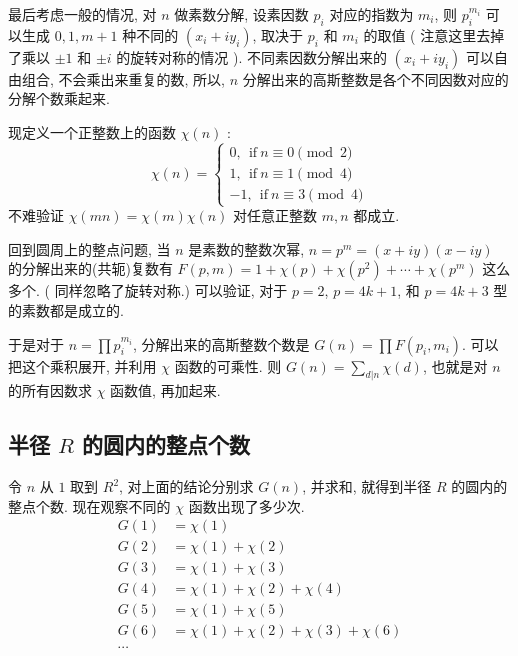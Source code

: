 最后考虑一般的情况, 对 $ n $ 做素数分解, 设素因数 $ p_i $ 对应的指数为 $ m_i $, 则 $ p_i^{m_i} $ 可以生成 $ 0, 1, m+1 $ 种不同的 $(x_i+iy_i)$, 取决于 $ p_i $ 和 $ m_i $ 的取值 ( 注意这里去掉了乘以 $ \pm 1 $ 和 $ \pm i $ 的旋转对称的情况 ). 不同素因数分解出来的 $(x_i+iy_i)$ 可以自由组合, 不会乘出来重复的数, 所以, $ n $ 分解出来的高斯整数是各个不同因数对应的分解个数乘起来.


现定义一个正整数上的函数 $ \chi(n) $ : 
\begin{equation*}
\chi(n) = \begin{cases}
0,\ \ \textrm{if} \ n \equiv 0 \pmod{2}\\
1,\ \ \textrm{if} \ n \equiv 1 \pmod{4}\\
-1,\ \ \textrm{if} \ n \equiv 3 \pmod{4}
\end{cases}
\end{equation*}
不难验证 $ \chi(mn) = \chi(m)\chi(n) $ 对任意正整数 $ m, n $ 都成立.

回到圆周上的整点问题, 当 $ n $ 是素数的整数次幂, $ n=p^m=(x+iy)(x-iy) $ 的分解出来的(共轭)复数有 $ F(p,m) = 1 + \chi(p) + \chi(p^2) + \cdots + \chi(p^m) $ 这么多个. ( 同样忽略了旋转对称.) 可以验证, 对于 $ p = 2 $, $ p = 4k+1 $, 和 $ p=4k+3 $ 型的素数都是成立的. 

于是对于 $ n = \prod{p_i^{m_i}} $, 分解出来的高斯整数个数是 $ G(n) = \prod{F(p_i,m_i)} $. 可以把这个乘积展开, 并利用 $ \chi $ 函数的可乘性. 则 $ G(n) = \sum_{d|n}{\chi(d)} $, 也就是对 $ n $ 的所有因数求 $ \chi $ 函数值, 再加起来. 

\subsection{半径 \texorpdfstring{$ R $}{R} 的圆内的整点个数}
令 $ n $ 从 $ 1 $ 取到 $ R^2 $, 对上面的结论分别求 $ G(n) $, 并求和, 就得到半径 $ R $ 的圆内的整点个数. 现在观察不同的 $ \chi $ 函数出现了多少次.
\begin{align*}
G(1) &= \chi(1) \\
G(2) &= \chi(1) + \chi(2) \\
G(3) &= \chi(1) + \chi(3) \\
G(4) &= \chi(1) + \chi(2) + \chi(4) \\
G(5) &= \chi(1) + \chi(5) \\
G(6) &= \chi(1) + \chi(2) + \chi(3) + \chi(6)\\
\cdots
\end{align*}

